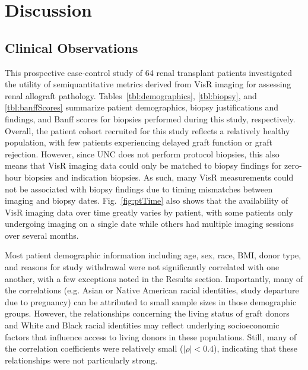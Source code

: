 \section{Discussion}

\subsection{Clinical Observations}

This prospective case-control study of 64 renal transplant patients investigated the utility of semiquantitative metrics derived from VisR imaging for assessing renal allograft pathology. Tables~\ref{tbl:demographics}, \ref{tbl:biopsy}, and \ref{tbl:banffScores} summarize patient demographics, biopsy justifications and findings, and Banff scores for biopsies performed during this study, respectively. Overall, the patient cohort recruited for this study reflects a relatively healthy population, with few patients experiencing delayed graft function or graft rejection. However, since UNC does not perform protocol biopsies, this also means that VisR imaging data could only be matched to biopsy findings for zero-hour biopsies and indication biopsies. As such, many VisR measurements could not be associated with biopsy findings due to timing mismatches between imaging and biopsy dates. Fig.~\ref{fig:ptTime} also shows that the availability of VisR imaging data over time greatly varies by patient, with some patients only undergoing imaging on a single date while others had multiple imaging sessions over several months. 

Most patient demographic information including age, sex, race, BMI, donor type, and reasons for study withdrawal were not significantly correlated with one another, with a few exceptions noted in the Results section. Importantly, many of the correlations (e.g. Asian or Native American racial identities, study departure due to pregnancy) can be attributed to small sample sizes in those demographic groups. However, the relationships concerning the living status of graft donors and White and Black racial identities may reflect underlying socioeconomic factors that influence access to living donors in these populations. Still, many of the correlation coefficients were relatively small ($|\rho| < 0.4$), indicating that these relationships were not particularly strong.

